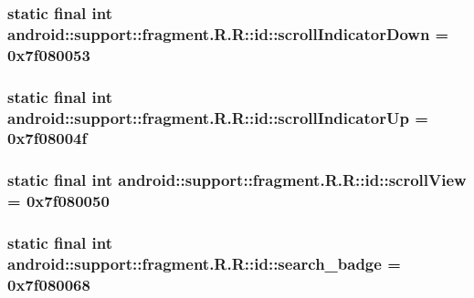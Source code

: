 \hypertarget{classandroid_1_1support_1_1fragment_1_1_r_1_1id_1355b776074e135efd7dcf45cff10db6}{
\subsubsection[{scrollIndicatorDown}]{\setlength{\rightskip}{0pt plus 5cm}static final int android::support::fragment.R.R::id::scrollIndicatorDown = 0x7f080053}}
\label{classandroid_1_1support_1_1fragment_1_1_r_1_1id_1355b776074e135efd7dcf45cff10db6}


\hypertarget{classandroid_1_1support_1_1fragment_1_1_r_1_1id_34c21e03cec3d77c592f14a3d2f70820}{
\subsubsection[{scrollIndicatorUp}]{\setlength{\rightskip}{0pt plus 5cm}static final int android::support::fragment.R.R::id::scrollIndicatorUp = 0x7f08004f}}
\label{classandroid_1_1support_1_1fragment_1_1_r_1_1id_34c21e03cec3d77c592f14a3d2f70820}


\hypertarget{classandroid_1_1support_1_1fragment_1_1_r_1_1id_d5593345f0e6957d2803fbb9c3668da2}{
\subsubsection[{scrollView}]{\setlength{\rightskip}{0pt plus 5cm}static final int android::support::fragment.R.R::id::scrollView = 0x7f080050}}
\label{classandroid_1_1support_1_1fragment_1_1_r_1_1id_d5593345f0e6957d2803fbb9c3668da2}


\hypertarget{classandroid_1_1support_1_1fragment_1_1_r_1_1id_5cd63ad6e633ea8648ee7b64d2165ae5}{
\subsubsection[{search\_\-badge}]{\setlength{\rightskip}{0pt plus 5cm}static final int android::support::fragment.R.R::id::search\_\-badge = 0x7f080068}}
\label{classandroid_1_1support_1_1fragment_1_1_r_1_1id_5cd63ad6e633ea8648ee7b64d2165ae5}


